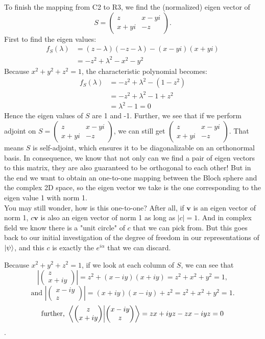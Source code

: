 \documentclass[12pt]{article}
\begin{document}
To finish the mapping from C2 to R3, we find the (normalized) eigen vector of $$S=\begin{pmatrix}
z & x-yi\\
x+yi & -z
\end{pmatrix}.$$ First to find the eigen values:
\begin{align*}
    f_S(\lambda)&=(z-\lambda)(-z-\lambda)-(x-yi)(x+yi)\\
                &=-z^2+\lambda^2-x^2-y^2
\end{align*}
Because $x^2+y^2+z^2=1$, the characteristic polynomial becomes:
\begin{align*}
    f_S(\lambda)&=-z^2+\lambda^2-(1-z^2)\\
                &=-z^2+\lambda^2-1+z^2\\
                &=\lambda^2-1=0
\end{align*}
Hence the eigen values of $S$ are 1 and -1. Further, we see that if we perform adjoint on $S=\begin{pmatrix}
z & x-yi\\
x+yi & -z
\end{pmatrix}$, we can still get $\begin{pmatrix}
z & x-yi\\
x+yi & -z
\end{pmatrix}$. That means $S$ is self-adjoint, which ensures it to be diagonalizable on an orthonormal basis. In consequence, we know that not only can we find a pair of eigen vectors to this matrix, they are also guaranteed to be orthogonal to each other! But in the end we want to obtain an one-to-one mapping between the Bloch sphere and the complex 2D space, so the eigen vector we take is the one corresponding to the eigen value 1 with norm 1. \\
You may still wonder, how is this one-to-one? After all, if $\mathbf{v}$ is an eigen vector of norm 1, $c\mathbf{v}$ is also an eigen vector of norm 1 as long as $|c|=1$. And in complex field we know there is a "unit circle" of $c$ that we can pick from. But this goes back to our initial investigation of the degree of freedom in our representations of $\ket{\psi}$, and this $c$ is exactly the $e^{i\alpha}$ that we can discard.

Because $x^2+y^2+z^2=1$, if we look at each column of $S$, we can see that $$\left|\begin{pmatrix}z\\x+iy\end{pmatrix}\right|=z^2+(x-iy)(x+iy)=z^2+x^2+y^2=1,$$
$$\text{and } \left|\begin{pmatrix}x-iy\\z\end{pmatrix}\right|=(x+iy)(x-iy)+z^2=z^2+x^2+y^2=1.$$
$$\text{further, }\braket{\begin{pmatrix}z\\x+iy\end{pmatrix}}{\begin{pmatrix}x-iy\\z\end{pmatrix}}=zx+iyz-zx-iyz=0$$.
\end{document}
